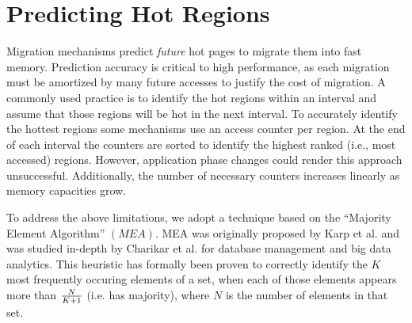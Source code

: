 
\section{Predicting Hot Regions}
\label{sec:MEA}


Migration mechanisms predict \textit{future} hot pages to migrate them into fast memory. Prediction accuracy is critical to high performance, as each migration must be amortized by many future accesses to justify the cost of migration.
A commonly used practice is to identify the hot regions within an interval 
and assume that those regions will be hot in the next interval. To accurately identify the hottest regions some mechanisms use an access counter per region. 
At the end of each interval the counters are sorted to identify the highest 
ranked (i.e., most accessed) regions. However, application phase changes could render this approach unsuccessful. Additionally, the number of necessary counters increases linearly as memory capacities grow.

To address the above limitations, we adopt a technique based on the ``Majority Element Algorithm'' $(MEA)$. MEA was originally proposed by Karp et al. \cite{karp-mea} and was studied in-depth by Charikar et al. \cite{charikar-mea} for database management and big data analytics. This heuristic has formally been proven to correctly identify the $K$ most frequently occuring elements of a set, when each of those elements appears more than $N \over K+1$ (i.e. has majority), where $N$ is the number of elements in that set. 


